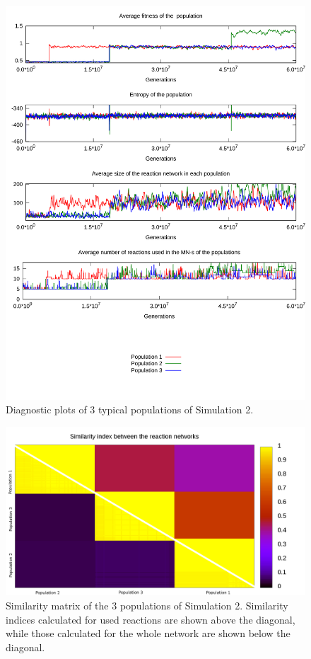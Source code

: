 \documentclass[a4paper,12pt]{article}
\begin{document}
\begin{figure}[htpb]
	\centering
	\includegraphics[width=0.8\linewidth]{simulation2.pdf}
	\caption{Diagnostic plots of 3 typical populations of Simulation 2.}
	\label{fig:simulation2}
\end{figure}

\begin{figure}[htpb]
	\centering
	\includegraphics[width=1\linewidth]{simmatrix_sim2.png}
	\caption{Similarity matrix of the $3$ populations of Simulation 2. Similarity indices calculated for used reactions are shown above the diagonal, while those calculated for the whole network are shown below the diagonal.}
	\label{fig:simmatrix_sim2}
\end{figure}
\end{document}
